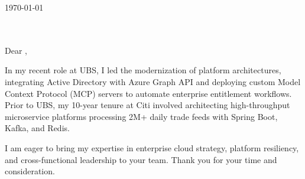 
\vspace{10pt}

\noindent \today \\[10pt]
\textbf{\varHiringManager} \\
\textbf{\varCompanyName} \\
\varLocation

\vspace{15pt}

\noindent Dear \varHiringManager,

\vspace{10pt}



\vspace{10pt}

\noindent In my recent role at UBS, I led the modernization of platform architectures, integrating Active Directory with Azure Graph API and deploying custom Model Context Protocol (MCP) servers to automate enterprise entitlement workflows. Prior to UBS, my 10-year tenure at Citi involved architecting high-throughput microservice platforms processing 2M+ daily trade feeds with Spring Boot, Kafka, and Redis.

\vspace{10pt}

\noindent I am eager to bring my expertise in enterprise cloud strategy, platform resiliency, and cross-functional leadership to your team. Thank you for your time and consideration.